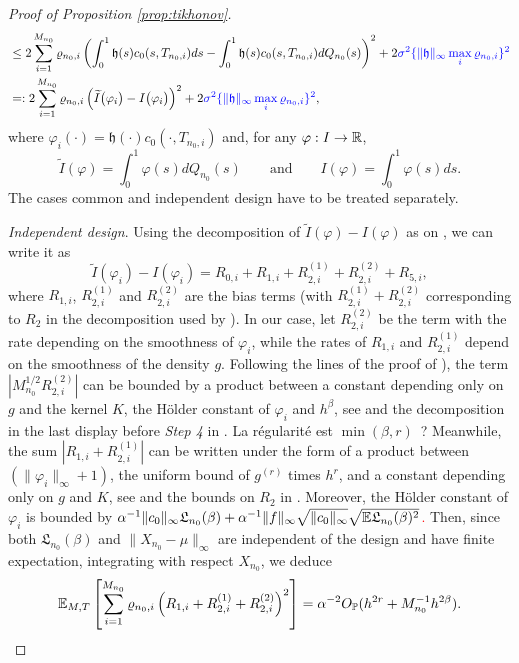\documentclass{article}
\begin{document}
\begin{proof}[Proof of Proposition \ref{prop:tikhonov}]
\begin{align*}
&\leq  2 \sum_{i=1}^{M_{n_0}} \varrho_{n_0,i} \left(\int_0^1 \mathfrak h(s)c_0(s,T_{n_0,i})ds - \int_0^1 \mathfrak h(s)c_0(s,T_{n_0,i})dQ_{n_0}(s)\right)^2+2 \color{blue} \sigma^2  \{\|\mathfrak h\|_\infty \max_i \varrho_{n_0,i} \}^2\color{black}\\
&= :  2 \sum_{i=1}^{M_{n_0}} \varrho_{n_0,i} \left(\widetilde I\big(\varphi_i \big) - I\big(\varphi_i\big) \right)^2+2 \color{blue} \sigma^2  \{\|\mathfrak h\|_\infty \max_i \varrho_{n_0,i} \}^2\color{black},
\end{align*}
where $\varphi_i(\cdot)  = \mathfrak h(\cdot) c_0(\cdot, T_{n_0,i} ) $ and, for any $\varphi :I \rightarrow \mathbb{R}$,  
$$
\widetilde I(\varphi)  =  \int_0^1 \varphi (s)dQ_{n_0}(s) \qquad\text{and}  \qquad  I(\varphi) = \int_0^1 \varphi (s)ds.
$$
The cases common and independent design have to be treated separately. 


\emph{Independent design}. 
\color{red} 
Using the decomposition of $\widetilde I(\varphi) - I(\varphi)$ as on \citet[p. 2196]{DP2016}, we can write it as
\begin{equation}\label{our_decom}
 \widetilde I(\varphi_i) - I(\varphi_i) =  R_{0,i} + R_{1,i} + R_{2,i}^{(1)} + R_{2,i}^{(2)} + R_{5,i},
\end{equation}
where  $R_{1,i}$, $R_{2,i}^{(1)}$ and $R_{2,i}^{(2)}$ are  the bias terms (with $R_{2,i}^{(1)} + R_{2,i}^{(2)}$ corresponding to  $R_2$ in the decomposition used by \citet[Step 3, p. 2191]{DP2016}). 
In our case, let $R_{2,i}^{(2)}$ be the term with the rate depending on the smoothness of $\varphi_i$, while the rates of $R_{1,i}$ and $R_{2,i}^{(1)}$ depend on the smoothness of the density $g$.
Following the lines of the proof of \citet[Theorem 1-(i)]{DP2016}), the term $|M_{n_0}^{1/2}R_{2,i}^{(2)}|$ can be bounded by a product between a constant depending only on $g$ and the kernel $K$, the Hölder constant of $\varphi_i$ and $h^\beta$, see \citet[Eq. (20) in Lemma 6]{DP2016} and the decomposition in the last display before \emph{Step 4} in \citet[on p. 2192]{DP2016}.
\color{purple}
La régularité est $\min(\beta,r)$~?
\color{red} 
Meanwhile, the sum $|R_{1,i}+R_{2,i}^{(1)}|$ can be written under the form of a product between  $(\|\varphi_i\|_\infty +1)$, the uniform bound of $g^{(r)}$ times $h^r$, and a constant depending only on $g$ and $K$, see \citet[Eq. (18) and (19) in Lemma 6]{DP2016} and the bounds on $R_2$ in \citet[p. 2192]{DP2016}.
Moreover,  the Hölder constant of $\varphi_i$ is bounded by  \textcolor{red}{$ \alpha^{-1} \|c_0\|_\infty \mathfrak L_{n_0} (\beta) + \alpha^{-1} \|f\|_\infty \sqrt{\|c_0\|_\infty}\sqrt{\mathbb{E} \mathfrak L_{n_0} (\beta)^2}$.} 
Then, since  both $\mathfrak L_{n_0} (\beta) $ and $\|X_{n_0}-\mu\|_\infty$ are independent of the design and have finite expectation, integrating with respect $X_{n_0}$, we deduce 
\begin{equation}\label{CP_bound2a}
\mathbb{E}_{M,T}\left[ \sum_{i=1}^{M_{n_0}} \varrho_{n_0,i} \left( R_{1,i} + R_{2,i}^{(1)} + R_{2,i}^{(2)} \right)^2 \right] = \alpha^{-2}O_{\mathbb P}(h^{2r}+M^{-1}_{n_0}h^{2\beta}).
\end{equation}


\end{proof}
\end{document}
